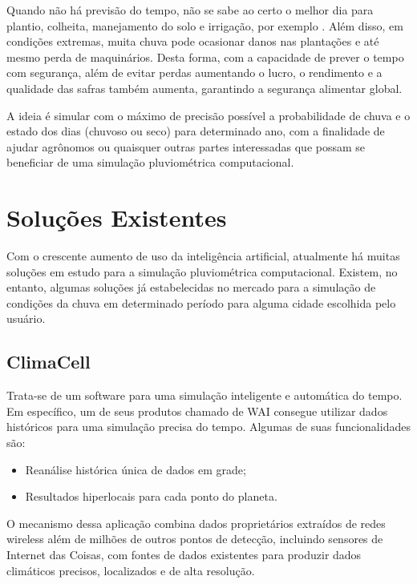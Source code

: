Quando não há previsão do tempo, não se sabe ao certo o melhor dia para plantio, 
colheita, manejamento do solo e irrigação, por exemplo \cite{artigo_importancia}. Além disso, em condições extremas, muita chuva pode ocasionar danos nas plantações e até mesmo perda de maquinários.
Desta forma, com a capacidade de prever o tempo com segurança, além de evitar perdas aumentando o lucro, o rendimento e a qualidade das safras também aumenta, garantindo a segurança alimentar global.

A ideia é simular com o máximo de precisão possível a probabilidade de chuva e o estado dos dias (chuvoso ou seco) para determinado ano, com a finalidade de ajudar agrônomos ou quaisquer outras partes interessadas que possam se beneficiar de uma simulação pluviométrica computacional.

\section{Soluções Existentes}
\label{s.solucoes}

Com o crescente aumento de uso da inteligência artificial, atualmente há muitas soluções em estudo para a simulação pluviométrica computacional. Existem, no entanto, algumas soluções já estabelecidas no mercado para a simulação de condições da chuva em determinado período para alguma cidade escolhida pelo usuário.

\subsection{ClimaCell}
\label{ss.climacell}
Trata-se de um software para uma simulação inteligente e automática do tempo. Em específico, um de seus produtos chamado de WAI consegue utilizar dados históricos para uma simulação precisa do tempo. Algumas de suas funcionalidades são:
\begin{itemize}
  \item Reanálise histórica única de dados em grade;
  \item Resultados hiperlocais para cada ponto do planeta.
\end{itemize}

O mecanismo dessa aplicação combina dados proprietários extraídos de redes wireless além de milhões de outros pontos de detecção, incluindo sensores de Internet das Coisas, com fontes de dados existentes para produzir dados climáticos precisos, localizados e de alta resolução.

